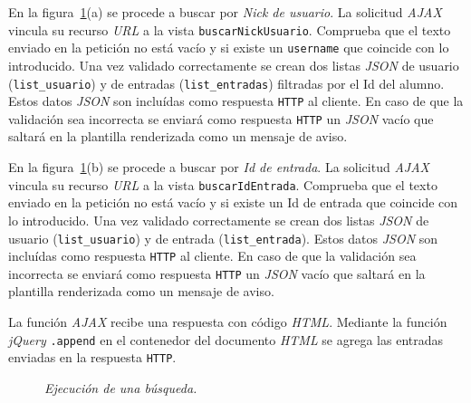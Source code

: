 \documentclass[a4paper, 12pt]{book}
\begin{document}
\begin{itemize}
  En la figura~\ref{fig:buscarajax}(a) se procede a buscar por \textit{Nick de usuario}. La solicitud \textit{AJAX} vincula su recurso \textit{URL} a la 
  vista \texttt{buscarNickUsuario}. Comprueba que el texto enviado en la petici\'on no est\'a vac\'io y si existe un \texttt{username} que coincide con lo
  introducido. Una vez validado correctamente se crean dos listas \textit{JSON} de usuario (\texttt{list\_usuario}) y de entradas (\texttt{list\_entradas}) 
  filtradas por el Id del alumno. Estos datos \textit{JSON} son inclu\'idas como respuesta \texttt{HTTP} al cliente. En caso de que la validaci\'on sea incorrecta 
  se enviar\'a como respuesta \texttt{HTTP} un \textit{JSON} vac\'io que saltar\'a en la plantilla renderizada como un mensaje de aviso.

  En la figura~\ref{fig:buscarajax}(b) se procede a buscar por \textit{Id de entrada}. La solicitud \textit{AJAX} vincula su recurso \textit{URL} a la 
  vista \texttt{buscarIdEntrada}. Comprueba que el texto enviado en la petici\'on no est\'a vac\'io y si existe un Id de entrada que coincide con lo
  introducido. Una vez validado correctamente se crean dos listas \textit{JSON} de usuario (\texttt{list\_usuario}) y de entrada (\texttt{list\_entrada}). 
  Estos datos \textit{JSON} son inclu\'idas como respuesta \texttt{HTTP} al cliente. En caso de que la validaci\'on sea incorrecta se enviar\'a como respuesta \texttt{HTTP} 
  un \textit{JSON} vac\'io que saltar\'a en la plantilla renderizada como un mensaje de aviso.
  
  La funci\'on \textit{AJAX} recibe una respuesta con c\'odigo \textit{HTML}. Mediante la funci\'on \textit{jQuery} \texttt{.append} en el contenedor del documento 
  \textit{HTML} se agrega las entradas enviadas en la respuesta \texttt{HTTP}.
  
  \begin{figure}
    \centering
    \caption{\textit{Ejecuci\'on de una b\'usqueda.}}
    \label{fig:buscarajax}
  \end{figure}
  
\end{itemize}
\end{document}
